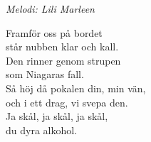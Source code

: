 {\footnotesize\textit{Melodi: Lili Marleen}}\par
\vspace{10pt}
Framför oss på bordet\\
står nubben klar och kall.\\
Den rinner genom strupen\\
som Niagaras fall.\\
Så höj då pokalen din, min vän,\\
och i ett drag, vi svepa den.\\
Ja skål, ja skål, ja skål,\\
du dyra alkohol.
